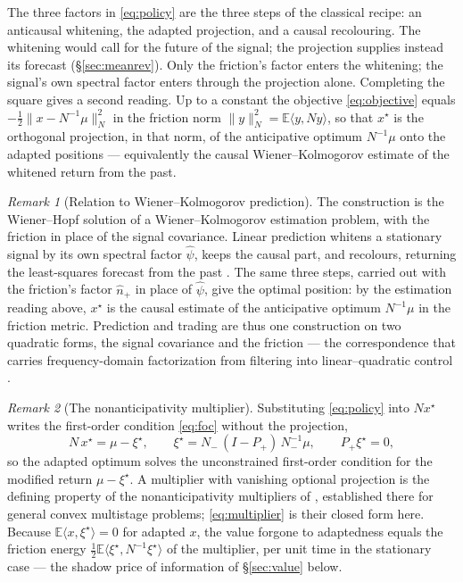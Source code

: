\documentclass[11pt]{article}
\newcommand{\E}{\mathbb{E}}
\theoremstyle{plain}
\theoremstyle{definition}
\theoremstyle{remark}
\newtheorem{remark}{Remark}
\begin{document}
The three factors in \eqref{eq:policy} are the three steps of the classical recipe: an anticausal whitening, the adapted projection, and a causal recolouring. The whitening would call for the future of the signal; the projection supplies instead its forecast (\S\ref{sec:meanrev}). Only the friction's factor enters the whitening; the signal's own spectral factor enters through the projection alone. Completing the square gives a second reading. Up to a constant the objective \eqref{eq:objective} equals $-\tfrac12\|x-N^{-1}\mu\|_N^2$ in the friction norm $\|y\|_N^2=\E\langle y,Ny\rangle$, so that $x^\star$ is the orthogonal projection, in that norm, of the anticipative optimum $N^{-1}\mu$ onto the adapted positions --- equivalently the causal Wiener--Kolmogorov estimate of the whitened return from the past.

\begin{remark}[Relation to Wiener--Kolmogorov prediction]\label{rmk:wk}
The construction is the Wiener--Hopf solution of a Wiener--Kolmogorov estimation problem, with the friction in place of the signal covariance. Linear prediction whitens a stationary signal by its own spectral factor $\hat\psi$, keeps the causal part, and recolours, returning the least-squares forecast from the past \citep{Wiener1949,Whittle1963}. The same three steps, carried out with the friction's factor $\hat n_+$ in place of $\hat\psi$, give the optimal position: by the estimation reading above, $x^\star$ is the causal estimate of the anticipative optimum $N^{-1}\mu$ in the friction metric. Prediction and trading are thus one construction on two quadratic forms, the signal covariance and the friction --- the correspondence that carries frequency-domain factorization from filtering into linear--quadratic control \citep{Whiteman1985}.
\end{remark}

\begin{remark}[The nonanticipativity multiplier]\label{rmk:duality}
Substituting \eqref{eq:policy} into $Nx^\star$ writes the first-order condition \eqref{eq:foc} without the projection,
\begin{equation}\label{eq:multiplier}
N\,x^\star = \mu - \xi^\star, \qquad \xi^\star = N_-\,(I-P_+)\,N_-^{-1}\mu, \qquad P_+\xi^\star = 0,
\end{equation}
so the adapted optimum solves the unconstrained first-order condition for the modified return $\mu-\xi^\star$. A multiplier with vanishing optional projection is the defining property of the nonanticipativity multipliers of \citet{RockafellarWets1976}, established there for general convex multistage problems; \eqref{eq:multiplier} is their closed form here. Because $\E\langle x,\xi^\star\rangle=0$ for adapted $x$, the value forgone to adaptedness equals the friction energy $\tfrac12\E\langle\xi^\star,N^{-1}\xi^\star\rangle$ of the multiplier, per unit time in the stationary case --- the shadow price of information of \S\ref{sec:value} below.
\end{remark}
\end{document}
